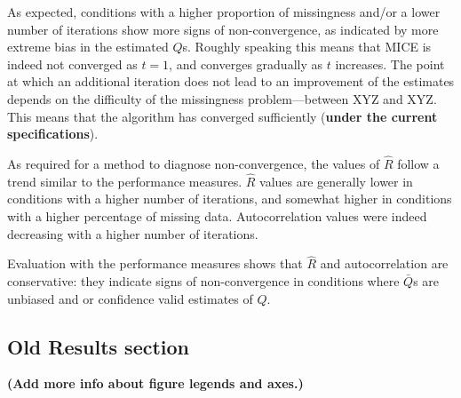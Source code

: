 \documentclass[Royal,times,sageh]{sagej}
\begin{document}
As expected, conditions with a higher proportion of missingness and/or a
lower number of iterations show more signs of non-convergence, as
indicated by more extreme bias in the estimated \(Q\)s. Roughly speaking
this means that MICE is indeed not converged as \(t=1\), and converges
gradually as \(t\) increases. The point at which an additional iteration
does not lead to an improvement of the estimates depends on the
difficulty of the missingness problem---between XYZ and XYZ. This means
that the algorithm has converged sufficiently (\textbf{under the current
specifications}).

As required for a method to diagnose non-convergence, the values of
\(\widehat{R}\) follow a trend similar to the performance measures.
\(\widehat{R}\) values are generally lower in conditions with a higher
number of iterations, and somewhat higher in conditions with a higher
percentage of missing data. Autocorrelation values were indeed
decreasing with a higher number of iterations.

Evaluation with the performance measures shows that \(\widehat{R}\) and
autocorrelation are conservative: they indicate signs of non-convergence
in conditions where \(\bar{Q}\)s are unbiased and or confidence valid
estimates of \(Q\).

\hypertarget{old-results-section}{%
\subsection{Old Results section}\label{old-results-section}}

\textbf{(Add more info about figure legends and axes.)}
\end{document}
